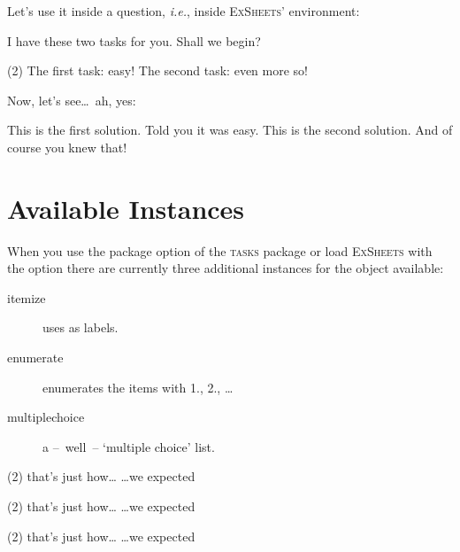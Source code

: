 \documentclass[DIV9,toc=index,toc=bib,numbers=noendperiod]{cnpkgdoc}
\newcommand*\Tasks{{\scshape\textcolor{main}{tasks}}\xspace}
\newcommand*\ExSheets{{\scshape\textcolor{main}{ExSheets}}\xspace}
\begin{document}
Let's use it inside a question, \textit{i.e.}, inside \ExSheets'
 environment:
\begin{beispiel}
 \begin{question}[type=exam]{4}
  I have these two tasks for you. Shall we begin?
  \begin{tasks}(2)
   \task The first task: easy!
   \task The second task: even more so!
  \end{tasks}
 \end{question}
 \begin{solution}[print]
  Now, let's see\ldots\ ah, yes:
  \begin{tasks}
   \task This is the first solution. Told you it was easy.
   \task This is the second solution. And of course you knew that!
  \end{tasks}
 \end{solution}
\end{beispiel}

\section{Available Instances}\label{sec:tasks:instances}
When you use the package option  of the \Tasks package or load
\ExSheets with the  option there are currently three
additional instances for the  object available:
\begin{description}
 \item[itemize] uses  as labels.
 \item[enumerate] enumerates the items with 1., 2., \ldots
 \item[multiplechoice] a --~well~-- `multiple choice' list.
\end{description}
\begin{beispiel}
 \begin{tasks}[style=itemize](2)
  \task that's just how\ldots
  \task \ldots we expected
 \end{tasks}
 \begin{tasks}[style=enumerate](2)
  \task that's just how\ldots
  \task \ldots we expected
 \end{tasks}
 \begin{tasks}[style=multiplechoice](2)
  \task that's just how\ldots
  \task \ldots we expected
 \end{tasks}
\end{beispiel}
\end{document}
